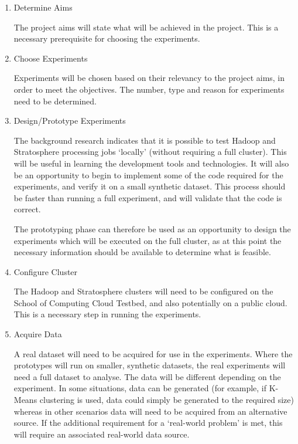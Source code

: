 \begin{enumerate}
	\item Determine Aims

	The project aims will state what will be achieved in the project. This is a necessary prerequisite for choosing the experiments. 

	\item Choose Experiments

	Experiments will be chosen based on their relevancy to the project aims, in order to meet the objectives. The number, type and reason for experiments need to be determined.

	\item Design/Prototype Experiments

	The background research indicates that it is possible to test Hadoop and Stratosphere processing jobs `locally' (without requiring a full cluster). This will be useful in learning the development tools and technologies. It will also be an opportunity to begin to implement some of the code required for the experiments, and verify it on a small synthetic dataset. This process should be faster than running a full experiment, and will validate that the code is correct.

	The prototyping phase can therefore be used as an opportunity to design the experiments which will be executed on the full cluster, as at this point the necessary information should be available to determine what is feasible.

	\item Configure Cluster

	The Hadoop and Stratosphere clusters will need to be configured on the School of Computing Cloud Testbed, and also potentially on a public cloud. This is a necessary step in running the experiments.

	\item Acquire Data

	A real dataset will need to be acquired for use in the experiments. Where the prototypes will run on smaller, synthetic datasets, the real experiments will need a full dataset to analyse. The data will be different depending on the experiment. In some situations, data can be generated (for example, if K-Means clustering is used, data could simply be generated to the required size) whereas in other scenarios data will need to be acquired from an alternative source. If the additional requirement for a `real-world problem' is met, this will require an associated real-world data source.


\end{enumerate}
